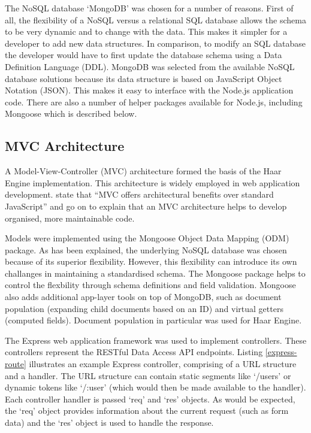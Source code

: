       The NoSQL database `MongoDB' was chosen for a number of reasons. First of all, the flexibility of a NoSQL versus a relational SQL database allows the schema to be very dynamic and to change with the data. This makes it simpler for a developer to add new data structures. In comparison, to modify an SQL database the developer would have to first update the database schema using a Data Definition Language (DDL). MongoDB was selected from the available NoSQL database solutions because its data structure is based on JavaScript Object Notation (JSON). This makes it easy to interface with the Node.js application code. There are also a number of helper packages available for Node.js, including Mongoose which is described below.

    \subsection{MVC Architecture}
      A Model-View-Controller (MVC) architecture formed the basis of the Haar Engine implementation. This architecture is widely employed in web application development. \citet{google-mvc} state that ``MVC offers architectural benefits over standard JavaScript'' and go on to explain that an MVC architecture helps to develop organised, more maintainable code.

      Models were implemented using the Mongoose Object Data Mapping (ODM) package. As has been explained, the underlying NoSQL database was chosen because of its superior flexibility. However, this flexibility can introduce its own challanges in maintaining a standardised schema. The Mongoose package helps to control the flexbility through schema definitions and field validation. Mongoose also adds additional app-layer tools on top of MongoDB, such as document population (expanding child documents based on an ID) and virtual getters (computed fields). Document population in particular was used for Haar Engine.

      The Express web application framework was used to implement controllers. These controllers represent the RESTful Data Access API endpoints. Listing \ref{express-route} illustrates an example Express controller, comprising of a URL structure and a handler. The URL structure can contain static segments like `/users' or dynamic tokens like `/:user' (which would then be made available to the handler). Each controller handler is passed `req' and `res' objects. As would be expected, the `req' object provides information about the current request (such as form data) and the `res' object is used to handle the response.

